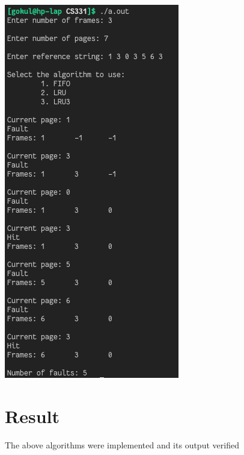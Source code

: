 \documentclass[13pt,oneside]{book}
\begin{document}
    \includegraphics[]{img/p3/ss3.png} 
    
\Large
\section*{Result}
\large
The above algorithms were implemented and its output verified
\end{document}
